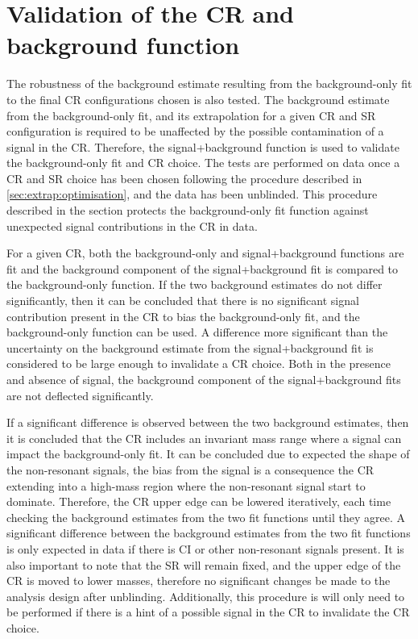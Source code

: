 \section{Validation of the CR and background function}
The robustness of the background estimate resulting from the background-only fit to the final CR configurations chosen is also tested. The background estimate from the background-only fit, and its extrapolation for a given CR and SR configuration is required to be unaffected by the possible contamination of a signal in the CR. Therefore, the signal+background function is used to validate the background-only fit and CR choice. The tests are performed on data once a CR and SR choice has been chosen following the procedure described in \cref{sec:extrap:optimisation}, and the data has been unblinded. This procedure described in the section protects the background-only fit function against unexpected signal contributions in the CR in data. 

For a given CR, both the background-only and signal+background functions are fit and the background component of the signal+background fit is compared to the background-only function. If the two background estimates do not differ significantly, then it can be concluded that there is no significant signal contribution present in the CR to bias the background-only fit, and the background-only function can be used. A difference  more significant than the uncertainty on the background estimate from the signal+background fit is considered to be large enough to invalidate a CR choice. Both in the presence and absence of signal, the background component of the signal+background fits are not deflected significantly. 

If a significant difference is observed between the two background estimates, then it is concluded that the CR includes an invariant mass range where a signal can impact the background-only fit. It can be concluded due to expected the shape of the non-resonant signals, the bias from the signal is a consequence the CR extending into a high-mass region where the non-resonant signal start to dominate. Therefore, the CR upper edge can be lowered iteratively, each time checking the background estimates from the two fit functions until they agree. A significant difference between the background estimates from the two fit functions is only expected in data if there is CI or other non-resonant signals present. It is also important to note that the SR will remain fixed, and the upper edge of the CR is moved to lower masses, therefore no significant changes be made to the analysis design after unblinding. Additionally, this procedure is will only need to be performed if there is a hint of a possible signal in the CR to invalidate the CR choice. 

